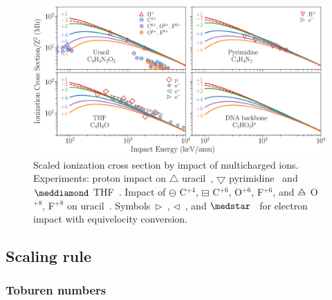 \documentclass[preprint,12pt]{article}
\begin{document}
\begin{figure}[t!]
\centering
\includegraphics[width=\textwidth]{figuras/adn2.eps}
\caption{Scaled ionization cross section by impact of multicharged ions. 
Experiments: proton impact on $\triangle$ uracil~\cite{itoh2013}, 
$\bigtriangledown$ pyrimidine~\cite{wolff2014} and $\meddiamond$
THF~\cite{wang2016}. Impact of $\ominus$ C$^{+4}$, 
$\boxminus$ C$^{+6}$, O$^{+6}$, F$^{+6}$, and
$\triangle\mkern-14mu-$ O$^{+8}$, F$^{+8}$ on 
uracil~\cite{agnihotri2012,agnihotri2013}. 
Symbols~$\rhd$~\cite{bug2017}, $\lhd$~\cite{wolf2019}, and 
$\medstar$~\cite{fuss2009} for electron impact with equivelocity conversion.}
\label{fig:crossDNA_2}
\end{figure} 

\subsection{Scaling rule}
\subsubsection{Toburen numbers}
\end{document}
